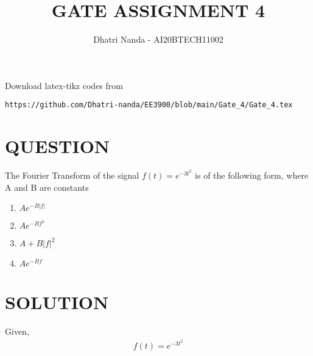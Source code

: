 \documentclass[journal,12pt,twocolumn]{IEEEtran}
\begin{document}
\let\vec\mathbf
\renewcommand{\thefigure}{\theproblem}
\def\putbox#1#2#3{\makebox[0in][l]{\makebox[#1][l]{}\raisebox{\baselineskip}[0in][0in]{\raisebox{#2}[0in][0in]{#3}}}}
     \def\rightbox#1{\makebox[0in][r]{#1}}
     \def\centbox#1{\makebox[0in]{#1}}
     \def\topbox#1{\raisebox{-\baselineskip}[0in][0in]{#1}}
     \def\midbox#1{\raisebox{-0.5\baselineskip}[0in][0in]{#1}}
\vspace{3cm}
\title{\textbf{ GATE ASSIGNMENT 4}}
\author{Dhatri Nanda - AI20BTECH11002}
\maketitle
\newpage
\bigskip
\renewcommand{\thefigure}{\arabic{figure}}
\renewcommand{\thetable}{\arabic{table}}
Download latex-tikz codes from 
%
\begin{lstlisting}
https://github.com/Dhatri-nanda/EE3900/blob/main/Gate_4/Gate_4.tex
\end{lstlisting}
\section*{QUESTION}
The Fourier Transform of the signal $f(t) = e^{-3t^2}$ is of the following form, where A and B are constants

\begin{enumerate}[label={\Alph*)}]
\item $Ae^{-B|f|}$\\
\item $Ae^{-Bf^2}$\\
\item $A + B|f|^2$\\
\item $Ae^{-Bf}$\\
\end{enumerate}

\section*{SOLUTION}
        Given, 
        \begin{align}
            f(t) = e^{-3t^2} \label{eq 1}
        \end{align}
        
\end{document}
